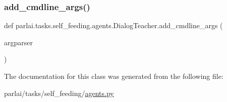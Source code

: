 \subsubsection{\texorpdfstring{add\+\_\+cmdline\+\_\+args()}{add\_cmdline\_args()}}
{\footnotesize\ttfamily def parlai.\+tasks.\+self\+\_\+feeding.\+agents.\+Dialog\+Teacher.\+add\+\_\+cmdline\+\_\+args (\begin{DoxyParamCaption}\item[{}]{argparser }\end{DoxyParamCaption})\hspace{0.3cm}{\ttfamily [static]}}



The documentation for this class was generated from the following file\+:\begin{DoxyCompactItemize}
\item 
parlai/tasks/self\+\_\+feeding/\hyperlink{parlai_2tasks_2self__feeding_2agents_8py}{agents.\+py}\end{DoxyCompactItemize}
